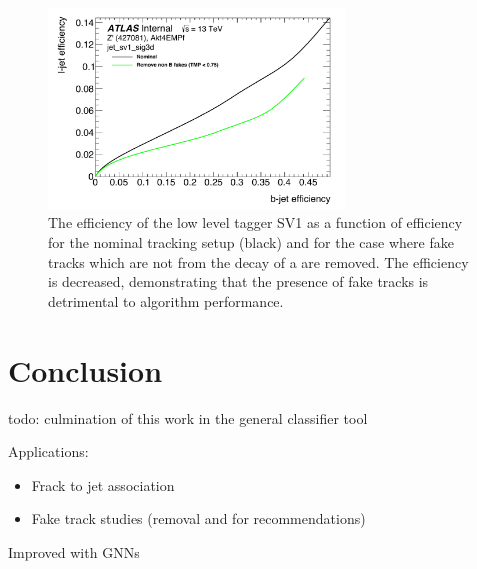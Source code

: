 \begin{figure}[!htbp]
    \centering
    \includegraphics[width=0.7\textwidth]{chapters/track_classifier/figs/sv1_perf_nofake.pdf}
    \caption{
      The \ljet efficiency of the low level tagger SV1 as a function of \bjet efficiency for the nominal tracking setup (black) and for the case where fake tracks which are not from the decay of a \bhadron are removed.
      The \ljet efficiency is decreased, demonstrating that the presence of fake tracks is detrimental to algorithm performance.
    }
    \label{fig:sv1_perf_nofake}
  \end{figure}


\section{Conclusion}
todo: culmination of this work in the general classifier tool

Applications:
\begin{itemize}
    \item Frack to jet association
    \item Fake track studies (removal and for recommendations)
\end{itemize}

Improved with GNNs